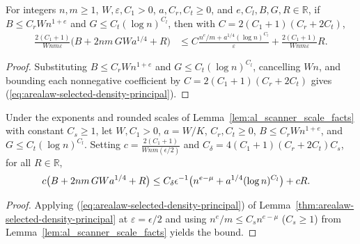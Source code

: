 \begin{lemma}
    \label{thm:arealaw-selected-density-principal}
    \leanok
    For integers $n,m\ge1$, $W,\varepsilon,C_1>0$, $a,C_r,C_t\ge0$, and $e,C_l,B,G,R\in\mathbb R$, if $B\le C_rWn^{1+e}$ and $G\le C_t(\log n)^{C_l}$, then with $C=2(C_1+1)(C_r+2C_t)$,
    \begin{align}
        \frac{2(C_1+1)}{Wnm\varepsilon}
        \bigl(B+2nm\,GW a^{1/4}+R\bigr)
         & \le C\frac{n^e/m+a^{1/4}(\log n)^{C_l}}{\varepsilon}
        +\frac{2(C_1+1)}{Wnm\varepsilon}R.
        \label{eq:arealaw-selected-density-principal}
    \end{align}
\end{lemma}
\begin{proof}
    \leanok
    Substituting $B\le C_rWn^{1+e}$ and $G\le C_t(\log n)^{C_l}$, cancelling $Wn$, and bounding each nonnegative coefficient by $C=2(C_1+1)(C_r+2C_t)$ gives (\ref{eq:arealaw-selected-density-principal}).
\end{proof}

\begin{lemma}
    \label{thm:arealaw-selected-density-delta}
    \leanok
    Under the exponents and rounded scales of Lemma~\ref{lem:al_scanner_scale_facts} with constant $C_s\ge1$, let $W,C_1>0$, $a=W/K$, $C_r,C_t\ge0$, $B\le C_rWn^{1+e}$, and $G\le C_t(\log n)^{C_l}$.
    Setting $c=\frac{2(C_1+1)}{Wnm(\epsilon/2)}$ and $C_\delta=4(C_1+1)(C_r+2C_t)C_s$, for all $R\in\mathbb R$,
    \begin{align}
        c\bigl(B+2nm\,GW a^{1/4}+R\bigr)
         & \le C_\delta\epsilon^{-1}
        \bigl(n^{e-\mu}+a^{1/4}(\log n)^{C_l}\bigr)+cR. \notag
    \end{align}
\end{lemma}
\begin{proof}
    \leanok
    Applying (\ref{eq:arealaw-selected-density-principal}) of Lemma~\ref{thm:arealaw-selected-density-principal} at $\varepsilon=\epsilon/2$ and using $n^e/m\le C_sn^{e-\mu}$ ($C_s\ge1$) from Lemma~\ref{lem:al_scanner_scale_facts} yields the bound.
\end{proof}


